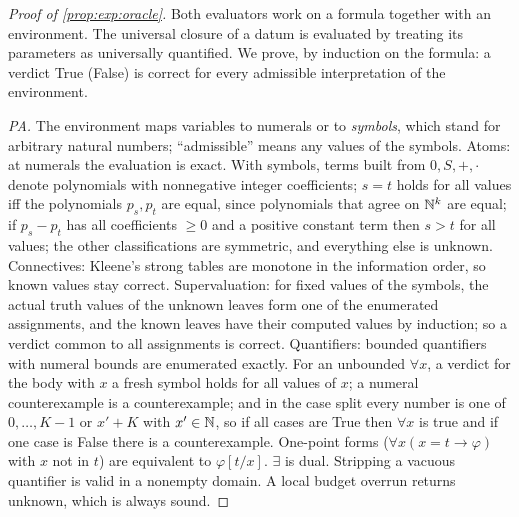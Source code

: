\begin{proof}[Proof of \cref{prop:exp:oracle}]
Both evaluators work on a formula together with an environment. The universal closure of a datum is evaluated by treating its parameters as universally quantified. We prove, by induction on the formula: a verdict True (False) is correct for every admissible interpretation of the environment.

\emph{PA.} The environment maps variables to numerals or to \emph{symbols}, which stand for arbitrary natural numbers; ``admissible'' means any values of the symbols. Atoms: at numerals the evaluation is exact. With symbols, terms built from $0,S,+,\cdot$ denote polynomials with nonnegative integer coefficients; $s=t$ holds for all values iff the polynomials $p_s,p_t$ are equal, since polynomials that agree on $\mathbb{N}^k$ are equal; if $p_s-p_t$ has all coefficients $\ge0$ and a positive constant term then $s>t$ for all values; the other classifications are symmetric, and everything else is unknown. Connectives: Kleene's strong tables are monotone in the information order, so known values stay correct. Supervaluation: for fixed values of the symbols, the actual truth values of the unknown leaves form one of the enumerated assignments, and the known leaves have their computed values by induction; so a verdict common to all assignments is correct. Quantifiers: bounded quantifiers with numeral bounds are enumerated exactly. For an unbounded $\forall x$, a verdict for the body with $x$ a fresh symbol holds for all values of $x$; a numeral counterexample is a counterexample; and in the case split every number is one of $0,\dots,K-1$ or $x'+K$ with $x'\in\mathbb{N}$, so if all cases are True then $\forall x$ is true and if one case is False there is a counterexample. One-point forms ($\forall x(x=t\to\varphi)$ with $x$ not in $t$) are equivalent to $\varphi[t/x]$. $\exists$ is dual. Stripping a vacuous quantifier is valid in a nonempty domain. A local budget overrun returns unknown, which is always sound.


\end{proof}
